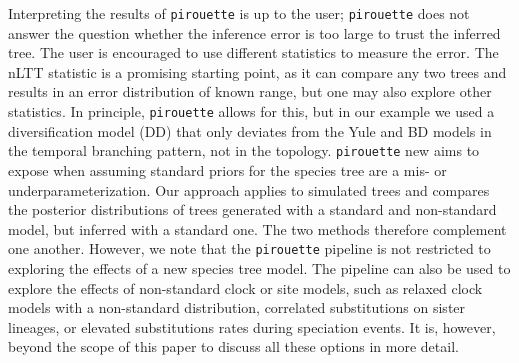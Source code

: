 Interpreting the results of \verb;pirouette; is up to the user; 
\verb;pirouette; does not answer the question 
whether the inference error is too large to trust the inferred tree. The user is encouraged to use different statistics to measure the error. The nLTT statistic is
a promising starting point, as it can compare any two trees and 
results in an error distribution of known range, but one may also explore other statistics.
In principle, \verb;pirouette; allows for this, but in our example we used a diversification model (DD) that only deviates from the Yule and BD models in the temporal branching pattern, not in the topology.
\verb;pirouette;
new{
	aims to expose when assuming standard priors for the 
	species tree are a mis- or underparameterization. 
	Our approach applies to simulated trees and compares 
	the posterior distributions of trees generated with 
	a standard and non-standard model, but inferred with a standard one. 
	The two methods therefore complement one another.
}
However, we note that the \verb;pirouette; pipeline is not restricted 
to exploring the effects of a new species tree model. 
The pipeline can also be used to explore the effects of non-standard 
clock or site models, such as relaxed clock models with a non-standard 
distribution, correlated substitutions on sister lineages, or elevated 
substitutions rates during speciation events. 
It is, however, beyond the scope of this paper to discuss all these options 
in more detail.

